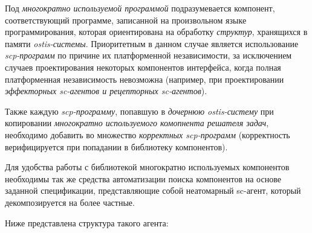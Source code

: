 Под \textit{многократно используемой программой} подразумевается компонент, соответствующий программе, записанной на произвольном языке программирования, которая ориентирована на обработку \textit{структур}, хранящихся в памяти \textit{ostis-системы}. Приоритетным в данном случае является использование \textit{scp-программ} по причине их платформенной независимости, за исключением случаев проектирования некоторых компонентов интерфейса, когда полная платформенная независимость невозможна (например, при проектировании \textit{эффекторных sc-агентов и рецепторных sc-агентов}).

Также каждую \textit{scp-программу}, попавшую в \textit{дочернюю ostis-систему} при копировании \textit{многократно используемого комопнента решателя задач}, необходимо добавить во множество \textit{корректных scp-программ} (корректность верифицируется при попадании в библиотеку компонентов).

Для удобства работы с библиотекой многократно используемых компонентов необходимы так же средства автоматизации поиска компонентов на основе заданной спецификации, представляющие собой неатомарный sc-агент, который декомпозируется на более частные.

Ниже представлена структура такого агента:

